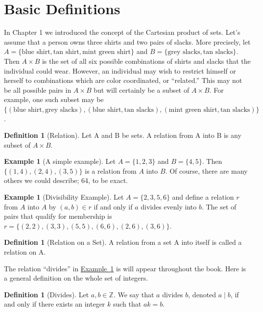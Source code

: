 \documentclass[10pt,]{book}
\theoremstyle{plain}
\theoremstyle{definition}
\newtheorem{definition}[theorem]{Definition}
\theoremstyle{definition}
\theoremstyle{definition}
\newtheorem{example}[theorem]{Example}
\theoremstyle{definition}
\begin{document}
\section[Basic Definitions]{Basic Definitions}\label{s-basic-definitions}
In Chapter 1 we introduced the concept of the Cartesian product of sets. Let's assume that a person owns three shirts and two pairs of slacks. More
precisely, let \(A = \{\textrm{blue shirt}, \textrm{tan shirt}, \textrm{mint green shirt}\}\) and \(B = \{\textrm{grey slacks}, \textrm{tan slacks}\}\). Then \(A\times B\) is the set of all six possible combinations of shirts and slacks that the individual could wear. However, an individual may wish to restrict himself or herself to combinations which are color coordinated, or ``related.'' This may not be all possible pairs in \(A\times B\) but will certainly be a subset of \(A\times B\). For example, one such subset may be \(\{(\textrm{blue shirt}, \textrm{grey slacks}), (\textrm{blue shirt},  \textrm{tan slacks}), (\textrm{mint green shirt}, \textrm{tan slacks})\}\).%
\begin{definition}[Relation]\label{Relation}
 Let A and B be sets. A relation from A into B is any subset of \(A\times B\).%
\end{definition}
\begin{example}[A simple example]\label{ex-simple-relation}
Let \(A = \{1, 2, 3\}\) and \(B = \{4, 5\}\). Then \(\{(1, 4), (2, 4), (3, 5)\}\) is a relation from \(A\) into \(B\). Of course, there are many others we could describe; 64, to be exact.%
\end{example}
\begin{example}[Divisibility Example]\label{ex-divides-example}
 Let \(A = \{2, 3, 5, 6\}\) and define a relation \(r\) from \(A\) into \(A\) by \((a, b) \in r\) if and only if \(a\) divides evenly into \(b\). The set of pairs that qualify for membership is \(r = \{(2, 2), (3, 3), (5, 5), (6, 6), (2, 6), (3, 6)\}\).
%
\end{example}
\begin{definition}[Relation on a Set]\label{relation-on-a-set}
A relation from a set A into itself is called a relation on A.%
\end{definition}
\par
The relation ``divides'' in \hyperref[ex-divides-example]{Example~\ref{ex-divides-example}} is will appear throughout the book. Here is a general definition on the whole set of integers.%
\begin{definition}[Divides]\label{Divides}
\label{notation-1}
Let \(a, b \in \mathbb{Z}\).  
We say that \(a\) divides \(b\), denoted \(a \mid b\),  if and only if there exists an integer \(k\) such that \(a k = b\).%
\end{definition}
\end{document}
